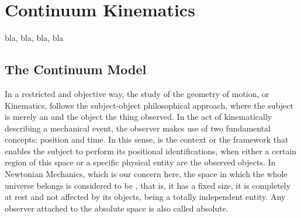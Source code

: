 \chapter{Continuum Kinematics}

bla, bla, bla, bla


\section{The Continuum Model}


In a restricted and objective way, the study of the geometry of motion, or Kinematics, follows the subject-object philosophical approach, where the subject is merely an  and the object the thing observed. In the act of kinematically describing a mechanical event, the observer makes use of two fundamental concepts: position and time. In this sense,  is the context or the framework that enables the subject to perform its positional identifications, when either a certain region of this space or a specific physical entity are the observed objects. In Newtonian Mechanics, which is our concern here, the space in which the whole universe belongs is considered to be , that is, it has a fixed size, it is completely at rest and not affected by its objects, being a totally independent entity. Any observer attached to the absolute space is also called absolute. 

